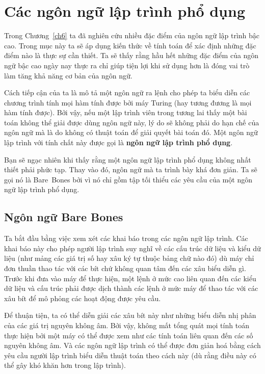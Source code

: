 \section{Các ngôn ngữ lập trình phổ dụng}
Trong Chương~\ref{ch6} ta đã nghiên cứu nhiều đặc điểm của ngôn ngữ lập trình bậc
cao. Trong mục này ta sẽ áp dụng kiến thức về tính toán để xác định những đặc điểm nào là
thực sự cần thiết. Ta sẽ thấy rằng hầu hết những đặc điểm của ngôn ngữ bậc cao ngày nay
thực ra chỉ giúp tiện lợi khi sử dụng hơn là đóng vai trò làm tăng khả năng cơ bản của
ngôn ngữ.

Cách tiếp cận của ta là mô tả một ngôn ngữ ra lệnh cho phép ta biểu diễn các chương trình
tính mọi hàm tính được bởi máy Turing (hay tương đương là mọi hàm tính được). Bởi vậy, nếu
một lập trình viên trong tương lai thấy một bài toán không thể giải được dùng ngôn ngữ
này, lý do sẽ không phải do hạn chế của ngôn ngữ mà là do không có thuật toán để giải
quyết bài toán đó. Một ngôn ngữ lập trình với tính chất này được gọi là \textbf{ngôn ngữ
  lập trình phổ dụng}.

Bạn sẽ ngạc nhiên khi thấy rằng một ngôn ngữ lập trình phổ dụng không nhất thiết phải phức
tạp. Thay vào đó, ngôn ngữ mà ta trình bày khá đơn giản. Ta sẽ gọi nó là Bare~Bones bởi vì
nó chỉ gồm tập tối thiểu các yêu cầu của một ngôn ngữ lập trình phổ dụng.

\subsection*{Ngôn ngữ Bare Bones}

Ta bắt đầu bằng việc xem xét các khai báo trong các ngôn ngữ lập trình. Các khai báo này
cho phép người lập trình suy nghĩ về các cấu trúc dữ liệu và kiểu dữ liệu (như mảng các
giá trị số hay xâu ký tự thuộc bảng chữ nào đó) dù máy chỉ đơn thuần thao tác với các bít
chứ không quan tâm đến các xâu biểu diễn gì. Trước khi đưa vào máy để thực hiện, một lệnh
ở mức cao liên quan đến các kiểu dữ liệu và cấu trúc phải được dịch thành các lệnh ở mức
máy để thao tác với các xâu bít để mô phỏng các hoạt động được yêu cầu.

Để thuận tiện, ta có thể diễn giải các xâu bít này như những biểu diễn nhị phân của các
giá trị nguyên không âm. Bởi vậy, không mất tổng quát mọi tính toán thực hiện bởi một máy
có thể được xem như các tính toán liên quan đến các số nguyên không âm. Và các ngôn ngữ
lập trình có thể được đơn giản hoá bằng cách yêu cầu người lập trình biểu diễn thuật toán
theo cách này (dù rằng điều này có thể gây khó khăn hơn trong lập trình).

